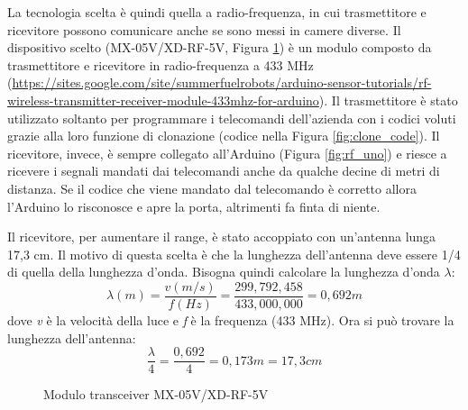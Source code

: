\documentclass[12pt]{report}
\begin{document}
La tecnologia scelta è quindi quella a radio-frequenza, in cui trasmettitore e ricevitore possono comunicare anche se sono messi in camere diverse. Il dispositivo scelto (MX-05V/XD-RF-5V, Figura \ref{fig:rx_tx_module}) è un modulo composto da trasmettitore e ricevitore in radio-frequenza a 433 MHz (\url{https://sites.google.com/site/summerfuelrobots/arduino-sensor-tutorials/rf-wireless-transmitter-receiver-module-433mhz-for-arduino}). Il trasmettitore è stato utilizzato soltanto per programmare i telecomandi dell'azienda con i codici voluti grazie alla loro funzione di clonazione (codice nella Figura \ref{fig:clone_code}). Il ricevitore, invece, è sempre collegato all'Arduino (Figura \ref{fig:rf_uno}) e riesce a ricevere i segnali mandati dai telecomandi anche da qualche decine di metri di distanza. Se il codice che viene mandato dal telecomando è corretto allora l'Arduino lo risconosce e apre la porta, altrimenti fa finta di niente. 


Il ricevitore, per aumentare il range, è stato accoppiato con un'antenna lunga 17,3 cm. Il motivo di questa scelta è che la lunghezza dell'antenna deve essere 1/4 di quella della lunghezza d'onda. Bisogna quindi calcolare la lunghezza d'onda $\lambda$:
%
\[\lambda(m) = \frac{v(m/s)}{f(Hz)} = \frac{299,792,458}{433,000,000} = 0,692 m\] 
%
dove \textit{v} è la velocità della luce e \textit{f} è la frequenza (433 MHz). Ora si può trovare la lunghezza dell'antenna: 
%
\[\frac{\lambda}{4} = \frac{0,692}{4} = 0,173m = 17,3 cm \]
%

\begin{figure}
	\caption{Modulo transceiver MX-05V/XD-RF-5V}
	\label{fig:rx_tx_module}
\end{figure}
\end{document}
